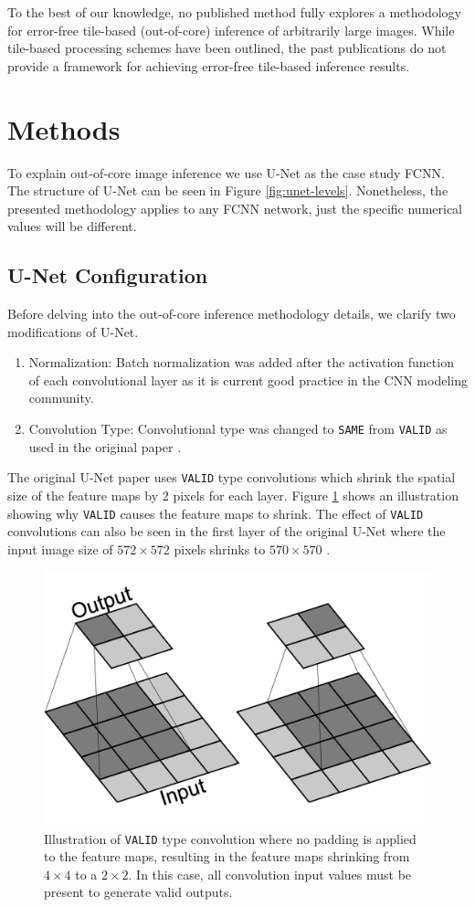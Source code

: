\documentclass[letterpaper]{article} %
\begin{document}
To the best of our knowledge, no published method fully explores a methodology for error-free tile-based (out-of-core) inference of arbitrarily large images. While tile-based processing schemes have been outlined, the past publications do not provide a framework for achieving error-free tile-based inference results.

\section{Methods}
\label{methods}

To explain out-of-core image inference we use U-Net \cite{Ronneberger2015a} as the case study FCNN. The structure of U-Net can be seen in Figure \ref{fig:unet-levels}. Nonetheless, the presented methodology applies to any FCNN network, just the specific numerical values will be different. 

\subsection{U-Net Configuration}

Before delving into the out-of-core inference methodology details, we clarify two modifications of U-Net. 

\begin{enumerate}
	\item Normalization: Batch normalization \cite{ioffe2015batch} was added after the activation function of each convolutional layer as it is current good practice in the CNN modeling community. 
	\item Convolution Type: Convolutional type was changed to \texttt{SAME} from \texttt{VALID} as used in the original paper \cite{Ronneberger2015a}.
\end{enumerate}

The original U-Net paper uses \texttt{VALID} type convolutions which shrink the spatial size of the feature maps by 2 pixels for each layer. Figure \ref{fig:valid} shows an illustration showing why \texttt{VALID} causes the feature maps to shrink. The effect of \texttt{VALID} convolutions can also be seen in the first layer of the original U-Net where the input image size of $572 \times 572$ pixels shrinks to $570 \times 570$ \cite{Ronneberger2015a}. 

\begin{figure}[h]
	\centering
	\includegraphics[width=0.4\linewidth]{figs/valid_padding.png}
	\caption{Illustration of \texttt{VALID} type convolution where no padding is applied to the feature maps, resulting in the feature maps shrinking from $4 \times 4$ to a $2 \times 2$. In this case, all convolution input values must be present to generate valid outputs.}
	\label{fig:valid}
\end{figure}
\end{document}
